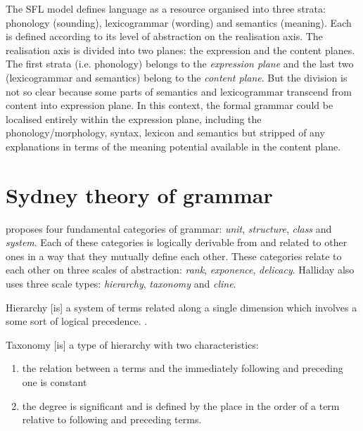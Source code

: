 The SFL model defines language as a resource organised into three strata: phonology (sounding), lexicogrammar (wording) and semantics (meaning). Each is defined according to its level of abstraction on the realisation axis. The realisation axis is divided into two planes: the expression and the content planes. The first strata (i.e. phonology) belongs to the \textit{expression plane} and the last two (lexicogrammar and semantics) belong to the \textit{content plane}. But the division is not so clear because some parts of semantics and lexicogrammar transcend from content into expression plane. 
In this context, the formal grammar could be localised entirely within the expression plane, including the phonology/morphology, syntax, lexicon and semantics but stripped of any explanations in terms of the meaning potential available in the content plane.


\section{Sydney theory of grammar}
\label{sec:sydney-theory-of-grammar}
\citet{Halliday2002} proposes four fundamental categories of grammar: \textit{unit}, \textit{structure}, \textit{class} and \textit{system}. Each of these categories is logically derivable from and related to other ones in a way that they mutually define each other. These categories relate to each other on three scales of abstraction: \textit{rank}, \textit{exponence}, \textit{delicacy}. Halliday also uses three scale types: \textit{hierarchy}, \textit{taxonomy} and \textit{cline}.

\begin{definition}[Hierarchy]\label{def:hierarchy}
	Hierarchy [is] a system of terms related along a single dimension which involves a some sort of logical precedence. 
	\citep[p.42]{Halliday2002}. 
\end{definition}

\begin{definition}[Taxonomy]\label{def:taxonomy}
	Taxonomy [is] a type of hierarchy with two characteristics:
	\begin{enumerate}
		\item the relation between a terms and the immediately following and preceding one is constant
		\item the degree is significant and is defined by the place in the order of a term relative to following and preceding terms. \citep[p.42]{Halliday2002}
	\end{enumerate}
\end{definition}

